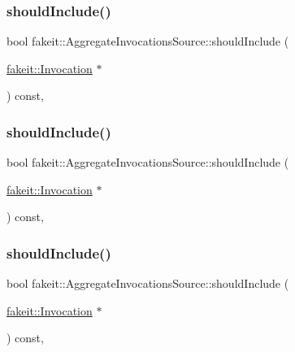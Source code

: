 \subsubsection{\texorpdfstring{shouldInclude()}{shouldInclude()}\hspace{0.1cm}{\footnotesize\ttfamily [5/9]}}
{\footnotesize\ttfamily bool fakeit\+::\+Aggregate\+Invocations\+Source\+::should\+Include (\begin{DoxyParamCaption}\item[{\mbox{\hyperlink{structfakeit_1_1Invocation}{fakeit\+::\+Invocation}} $\ast$}]{ }\end{DoxyParamCaption}) const\hspace{0.3cm}{\ttfamily [inline]}, {\ttfamily [protected]}}

\mbox{\label{structfakeit_1_1AggregateInvocationsSource_a7e02b97ba9e4b12765d7d46420fab1e7}} 
\subsubsection{\texorpdfstring{shouldInclude()}{shouldInclude()}\hspace{0.1cm}{\footnotesize\ttfamily [6/9]}}
{\footnotesize\ttfamily bool fakeit\+::\+Aggregate\+Invocations\+Source\+::should\+Include (\begin{DoxyParamCaption}\item[{\mbox{\hyperlink{structfakeit_1_1Invocation}{fakeit\+::\+Invocation}} $\ast$}]{ }\end{DoxyParamCaption}) const\hspace{0.3cm}{\ttfamily [inline]}, {\ttfamily [protected]}}

\mbox{\label{structfakeit_1_1AggregateInvocationsSource_a7e02b97ba9e4b12765d7d46420fab1e7}} 
\subsubsection{\texorpdfstring{shouldInclude()}{shouldInclude()}\hspace{0.1cm}{\footnotesize\ttfamily [7/9]}}
{\footnotesize\ttfamily bool fakeit\+::\+Aggregate\+Invocations\+Source\+::should\+Include (\begin{DoxyParamCaption}\item[{\mbox{\hyperlink{structfakeit_1_1Invocation}{fakeit\+::\+Invocation}} $\ast$}]{ }\end{DoxyParamCaption}) const\hspace{0.3cm}{\ttfamily [inline]}, {\ttfamily [protected]}}

